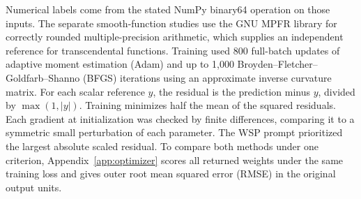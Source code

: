 Numerical labels come from the stated NumPy binary64 operation on those inputs. The separate smooth-function studies use the GNU MPFR library for correctly rounded multiple-precision arithmetic, which supplies an independent reference for transcendental functions. Training used 800 full-batch updates of adaptive moment estimation (Adam) and up to 1,000 Broyden--Fletcher--Goldfarb--Shanno (BFGS) iterations using an approximate inverse curvature matrix. For each scalar reference \(y\), the residual is the prediction minus \(y\), divided by \(\max(1,|y|)\). Training minimizes half the mean of the squared residuals. Each gradient at initialization was checked by finite differences, comparing it to a symmetric small perturbation of each parameter. The WSP prompt prioritized the largest absolute scaled residual. To compare both methods under one criterion, Appendix~\ref{app:optimizer} scores all returned weights under the same training loss and gives outer root mean squared error (RMSE) in the original output units.
